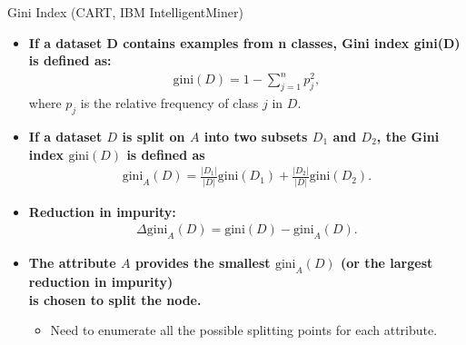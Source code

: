 \begin{frame}{Gini Index (CART, IBM IntelligentMiner)}
	\begin{itemize}
		\item \textbf{If a dataset D contains examples from n classes, Gini index gini(D) is defined as:}
		      \begin{align}
			      \text{gini}(D) = 1-\sum_{j=1}^{n} p_j^2,
		      \end{align}
		      where $p_j$ is the relative frequency of class $j$ in $D$.
		\item \textbf{If a dataset $D$ is split on $A$ into two subsets $D_1$ and $D_2$, the Gini index $\text{gini}(D)$ is defined as}
		      \begin{align}
			      \text{gini}_A(D) = \frac{|D_1|}{|D|}\text{gini}(D_1)+\frac{|D_2|}{|D|}\text{gini}(D_2).
		      \end{align}
		\item \textbf{Reduction in impurity:}
		      \begin{align}
			      \Delta \text{gini}_A(D) = \text{gini}(D)-\text{gini}_A(D).
		      \end{align}
		\item \textbf{The attribute $A$ provides the smallest $\text{gini}_A(D)$ (or the largest reduction in impurity) \\ is chosen to split the node.}
		      \begin{itemize}
			      \item Need to enumerate all the possible splitting points for each attribute.
		      \end{itemize}
	\end{itemize}
\end{frame}


